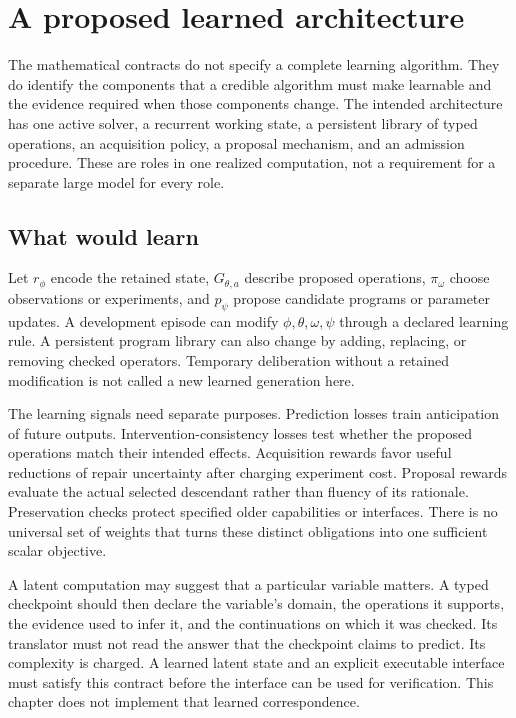 \section{A proposed learned architecture}\label{SII:sec:architecture}
The mathematical contracts do not specify a complete learning algorithm. They do identify the components that a credible algorithm must make learnable and the evidence required when those components change. The intended architecture has one active solver, a recurrent working state, a persistent library of typed operations, an acquisition policy, a proposal mechanism, and an admission procedure. These are roles in one realized computation, not a requirement for a separate large model for every role.

\subsection{What would learn}
Let $r_\phi$ encode the retained state, $G_{\theta,a}$ describe proposed operations, $\pi_\omega$ choose observations or experiments, and $p_\psi$ propose candidate programs or parameter updates. A development episode can modify $\phi,\theta,\omega,\psi$ through a declared learning rule. A persistent program library can also change by adding, replacing, or removing checked operators. Temporary deliberation without a retained modification is not called a new learned generation here.

The learning signals need separate purposes. Prediction losses train anticipation of future outputs. Intervention-consistency losses test whether the proposed operations match their intended effects. Acquisition rewards favor useful reductions of repair uncertainty after charging experiment cost. Proposal rewards evaluate the actual selected descendant rather than fluency of its rationale. Preservation checks protect specified older capabilities or interfaces. There is no universal set of weights that turns these distinct obligations into one sufficient scalar objective.

A latent computation may suggest that a particular variable matters. A typed checkpoint should then declare the variable's domain, the operations it supports, the evidence used to infer it, and the continuations on which it was checked. Its translator must not read the answer that the checkpoint claims to predict. Its complexity is charged. A learned latent state and an explicit executable interface must satisfy this contract before the interface can be used for verification. This chapter does not implement that learned correspondence.

